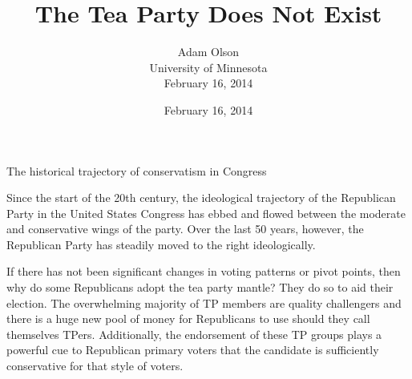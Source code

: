 \documentclass[12pt]{article}
\author{Adam Olson\\University of Minnesota\\February 16, 2014}
\title{The Tea Party Does Not Exist}
\date{February 16, 2014}
\makeatletter
\renewcommand{\maketitle}{\bgroup\setlength{\parindent}{0pt}
\begin{flushleft}
  \textbf{\@title}

  \@author
\end{flushleft}\egroup
}
\makeatother
\begin{document}
\maketitle

The historical trajectory of conservatism in Congress 

Since the start of the 20th century, the ideological trajectory of the Republican Party in the United States Congress has ebbed and flowed between the moderate and conservative wings of the party. Over the last 50 years, however, the Republican Party has steadily moved to the right ideologically.


If there has not been significant changes in voting patterns or pivot points, then why do some Republicans adopt the tea party mantle? They do so to aid their election. The overwhelming majority of TP members are quality challengers and there is a huge new pool of money for Republicans to use should they
call themselves TPers. Additionally, the endorsement of these TP groups plays a powerful cue to Republican primary voters that the candidate is sufficiently conservative for that style of voters.

\newpage
    {}


\end{document}
